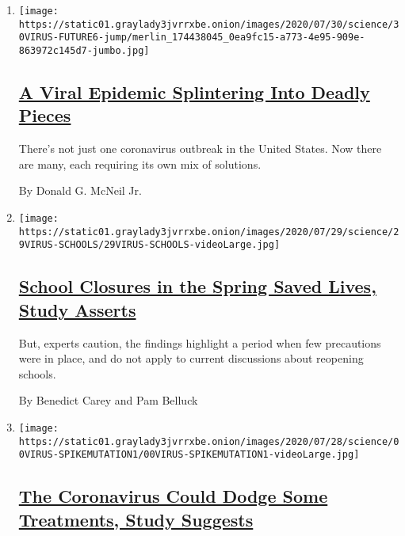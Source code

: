 \begin{enumerate}
\def\labelenumi{\arabic{enumi}.}
\item
  \texttt{[image: https://static01.graylady3jvrrxbe.onion/images/2020/07/30/science/30VIRUS-FUTURE6-jump/merlin\_174438045\_0ea9fc15-a773-4e95-909e-863972c145d7-jumbo.jpg]}

  \hypertarget{a-viral-epidemic-splintering-into-deadly-pieces}{%
  \subsection{\texorpdfstring{\href{/2020/07/29/health/coronavirus-future-america.html}{A
  Viral Epidemic Splintering Into Deadly
  Pieces}}{A Viral Epidemic Splintering Into Deadly Pieces}}\label{a-viral-epidemic-splintering-into-deadly-pieces}}

  There's not just one coronavirus outbreak in the United States. Now
  there are many, each requiring its own mix of solutions.

  By Donald G. McNeil Jr.
\item
  \texttt{[image: https://static01.graylady3jvrrxbe.onion/images/2020/07/29/science/29VIRUS-SCHOOLS/29VIRUS-SCHOOLS-videoLarge.jpg]}

  \hypertarget{school-closures-in-the-spring-saved-lives-study-asserts}{%
  \subsection{\texorpdfstring{\href{/2020/07/29/health/covid-school-reopening.html}{School
  Closures in the Spring Saved Lives, Study
  Asserts}}{School Closures in the Spring Saved Lives, Study Asserts}}\label{school-closures-in-the-spring-saved-lives-study-asserts}}

  But, experts caution, the findings highlight a period when few
  precautions were in place, and do not apply to current discussions
  about reopening schools.

  By Benedict Carey and Pam Belluck
\item
  \texttt{[image: https://static01.graylady3jvrrxbe.onion/images/2020/07/28/science/00VIRUS-SPIKEMUTATION1/00VIRUS-SPIKEMUTATION1-videoLarge.jpg]}

  \hypertarget{the-coronavirus-could-dodge-some-treatments-study-suggests}{%
  \subsection{\texorpdfstring{\href{/2020/07/28/health/coronavirus-mutation-spike-treatment.html}{The
  Coronavirus Could Dodge Some Treatments, Study
  Suggests}}{The Coronavirus Could Dodge Some Treatments, Study Suggests}}\label{the-coronavirus-could-dodge-some-treatments-study-suggests}}


\end{enumerate}

